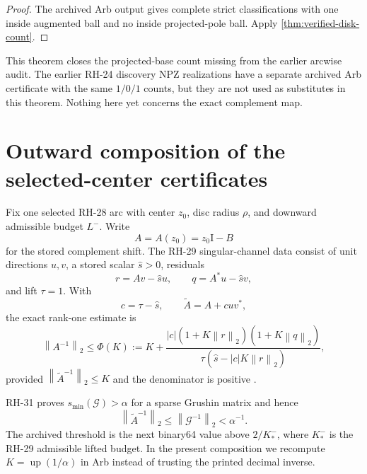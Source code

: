 \documentclass[11pt]{article}
\theoremstyle{definition}
\theoremstyle{remark}
\newcommand{\Id}{\mathrm I}
\newcommand{\norm}[1]{\left\lVert#1\right\rVert}
\newcommand{\up}{\operatorname{up}}
\newcommand{\Atilde}{\widetilde A}
\begin{document}
\begin{proof}
The archived Arb output gives complete strict classifications with one
inside augmented ball and no inside projected-pole ball.  Apply
\cref{thm:verified-disk-count}.
\end{proof}

This theorem closes the projected-base count missing from the earlier
arcwise audit.  The earlier RH-24 discovery NPZ realizations have a separate
archived Arb certificate with the same $1/0/1$ counts, but they are not used
as substitutes in this theorem.  Nothing here yet concerns the exact
complement map.


\section{Outward composition of the selected-center certificates}
\label{sec:composition}

Fix one selected RH-28 arc with center $z_0$, disc radius $\rho$, and
downward admissible budget $L^-$.  Write
\begin{equation}
 A=A(z_0)=z_0\Id-B
 \label{eq:complement-center}
\end{equation}
for the stored complement shift.  The RH-29 singular-channel data consist
of unit directions $u,v$, a stored scalar $\widehat s>0$, residuals
\begin{equation}
 r=Av-\widehat s u,
 \qquad
 q=A^*u-\widehat s v,
 \label{eq:singular-residuals}
\end{equation}
and lift $\tau=1$.  With
\begin{equation}
 c=\tau-\widehat s,
 \qquad
 \Atilde=A+cuv^*,
 \label{eq:lift}
\end{equation}
the exact rank-one estimate is
\begin{equation}
 \norm{A^{-1}}_2
 \leq \Phi(K):=
 K+\frac{|c|(1+K\norm r_2)(1+K\norm q_2)}
 {\tau(\widehat s-|c|K\norm r_2)},
 \label{eq:phi}
\end{equation}
provided $\norm{\Atilde^{-1}}_2\leq K$ and the denominator is positive
\citep{WangDeflated2026}.

RH-31 proves $s_{\min}(\mathcal G)>\alpha$ for a sparse Grushin matrix and
hence
\begin{equation}
 \norm{\Atilde^{-1}}_2\leq\norm{\mathcal G^{-1}}_2<\alpha^{-1}.
 \label{eq:rh31-bound}
\end{equation}
The archived threshold is the next binary64 value above $2/K_*^-$, where
$K_*^-$ is the RH-29 admissible lifted budget.  In the present composition
we recompute $K=\up(1/\alpha)$ in Arb instead of trusting the printed
decimal inverse.
\end{document}
